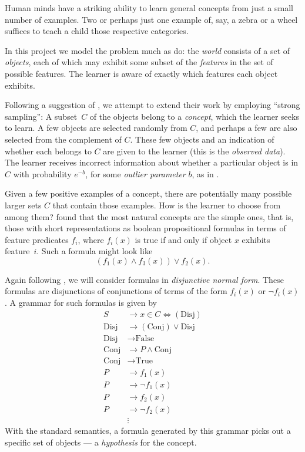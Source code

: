 \documentclass[jou,apacite]{apa6}
\author{Leon Lin}
\affiliation{\mbox{}}
\newcommand{\Disj}{\text{Disj}}
\newcommand{\Conj}{\text{Conj}}
\newcommand{\True}{\text{True}}
\newcommand{\False}{\text{False}}
\begin{document}
\maketitle    
                        
Human minds have a striking ability to learn general concepts from
just a small number of examples. Two or perhaps just one example of,
say, a zebra or a wheel suffices to teach a child those respective
categories.

In this project we 
model the problem much as 
\citet*{rrdnf} do:
the \emph{world}
consists of a set of \emph{objects}, each of which may exhibit
some subset of the \emph{features} in the set of possible features.
The learner is aware of exactly which features each object exhibits.

Following a suggestion of \citet{rrdnf}, we attempt to extend their
work by employing ``strong sampling'':
A subset~$C$ of the objects belong to a \emph{concept}, which the learner
seeks to learn. A few objects are selected randomly from $C$, and
perhaps a few are also selected from the complement of $C$. These few
objects and an indication of whether each belongs to $C$ are given to
the learner (this is the \emph{observed data}). The learner receives
incorrect information about whether a particular object is in $C$ 
with probability $e^{-b}$, for some \emph{outlier parameter} $b$,
as in \citet{rrdnf}.

Given a few positive examples of a concept, there are potentially
many possible larger sets $C$ that contain those examples. How is the
learner to choose from among them? \citet{feldman} found that the most
natural concepts are the simple ones, that is, those with short
representations as boolean propositional formulas in terms of feature
predicates $f_i$, where $f_i(x)$ is true if and only if object $x$
exhibits feature~$i$. Such a formula might look like
\[ (f_1(x)\wedge f_3(x)) \vee f_2(x).  \]

Again following \citet{rrdnf}, we will consider formulas in
\emph{disjunctive normal form}. These formulas are disjunctions
of conjunctions of terms of the form $f_i(x)$ or $\neg f_i(x)$.
A grammar for such formulas is given by
\begin{align*}
	S &\to x\in C \Leftrightarrow (\Disj)\\
	\Disj &\to (\Conj) \vee \Disj \\
	\Disj &\to \False \\
	\Conj &\to P \wedge \Conj\\
	\Conj &\to \True\\
	P &\to f_1(x)\\
	P &\to \neg f_1(x)\\
	P &\to f_2(x)\\
	P &\to \neg f_2(x)\\
	&\vdots
\end{align*}
With the standard semantics, a formula generated by this grammar
picks out a specific set of objects --- a \emph{hypothesis}
for the concept.
\end{document}
